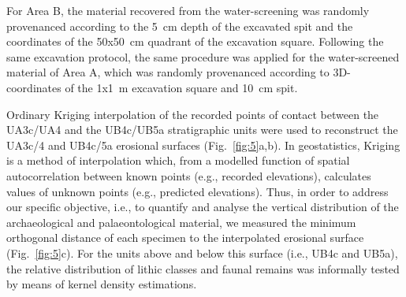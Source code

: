 \documentclass[preprint,authoryear,times]{elsarticle} %
\begin{document}
\begin{table}[]
  \caption{List of sampled observations for the vertical distribution and point pattern analyses.}
  \label{tab:2}
  \vspace{0.1in}
\end{table}

For Area B, the material recovered from the water-screening was randomly provenanced according to the 5~cm depth of the excavated spit and the coordinates of the 50x50~cm quadrant of the excavation square. Following the same excavation protocol, the same procedure was applied for the water-screened material of Area A, which was randomly provenanced according to 3D-coordinates of the 1x1~m excavation square and 10~cm spit.

Ordinary Kriging interpolation of the recorded points of contact between the UA3c/UA4 and the UB4c/UB5a stratigraphic units were used to reconstruct the UA3c/4 and UB4c/5a erosional surfaces (Fig.~\ref{fig:5}a,b). In geostatistics, Kriging is a method of interpolation which, from a modelled function of spatial autocorrelation between known points (e.g., recorded elevations), calculates values of unknown points (e.g., predicted elevations). Thus, in order to address our specific objective, i.e., to quantify and analyse the vertical distribution of the archaeological and palaeontological material, we measured the minimum orthogonal distance of each specimen to the interpolated erosional surface (Fig.~\ref{fig:5}c). For the units above and below this surface (i.e., UB4c and UB5a), the relative distribution of lithic classes and faunal remains was informally tested by means of kernel density estimations.
\end{document}
